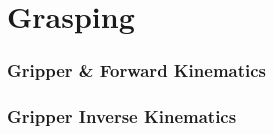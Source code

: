 \section{Grasping}

\begin{frame}
\frametitle{Gripper \& Forward Kinematics}
\end{frame}

\begin{frame}
\frametitle{Gripper Inverse Kinematics}
\end{frame}

